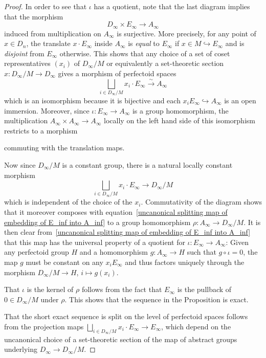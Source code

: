 \documentclass[11pt,oneside]{amsart}
\theoremstyle{definition}
\theoremstyle{remark}
\begin{document}
\begin{proof}
	In order to see that $\iota$ has a quotient, note that the last diagram implies that the morphism
	\[D_\infty\times E_\infty \rightarrow A_\infty\]
	induced from multiplication on $A_\infty$ is surjective. More precisely, for any point of $x\in D_n$, the translate $x\cdot E_\infty$ inside $A_\infty$ is \textit{equal} to $E_\infty$ if $x\in M \hookrightarrow E_\infty$ and is \textit{disjoint} from $E_\infty$ otherwise. This shows that any choice of a set of coset representatives $(x_i)$ of $D_\infty/M$ or equivalently a set-theoretic section  $x:D_\infty/M\rightarrow D_\infty$ gives a morphism of perfectoid spaces
	\begin{equation}\label{uncanonical splitting map of embedding of E_inf into A_inf}
	\bigsqcup_{i\in D_\infty/M} x_i\cdot E_\infty\xrightarrow{\sim} A_\infty
	\end{equation}
	which is an isomorphism because it is bijective and each $x_iE_\infty \hookrightarrow A_\infty$ is an open immersion. Moreover, since $\iota:E_\infty\rightarrow A_\infty$ is a group homomorphism, the multiplication $A_\infty\times A_\infty \rightarrow A_\infty$ locally on the left hand side of this isomorphism restricts to a morphism
	\begin{center}
	\end{center}
	commuting with the translation maps.
	
	Now since $D_\infty/M$ is a constant group, there is a natural locally constant morphism
	\[\bigsqcup_{i\in D_\infty/M} x_i\cdot E_\infty \rightarrow D_\infty/M\]
	which is independent of the choice of the $x_i$.
	Commutativity of the diagram shows that it moreover composes with equation~\ref{uncanonical splitting map of embedding of E_inf into A_inf} to a group homomorphism $\rho:A_\infty \rightarrow D_\infty/M$. It is then clear from~\ref{uncanonical splitting map of embedding of E_inf into A_inf} that this map has the universal property of a quotient for $\iota:E_\infty \rightarrow A_\infty$: Given any perfectoid group $H$ and a homomorphism $g:A_\infty\rightarrow H$ such that $g\circ\iota = 0$, the map $g$ must be constant on any $x_iE_\infty$ and thus factors uniquely through the morphism $D_\infty/M \rightarrow H$, $i\mapsto g(x_i)$.
	
	That $\iota$ is the kernel of $\rho$ follows from the fact that $E_\infty$ is the pullback of $0\in D_\infty/M$ under $\rho$. This shows that the sequence in the Proposition is exact.
	
	That the short exact sequence is split on the level of perfectoid spaces follows from the projection maps $\bigsqcup_{i\in D_\infty/M} x_i\cdot E_\infty \rightarrow E_\infty$, which depend on the uncanonical choice of a set-theoretic section of the map of abstract groups underlying $D_\infty \rightarrow D_\infty/M$.
	\end{proof}
	
\end{document}
